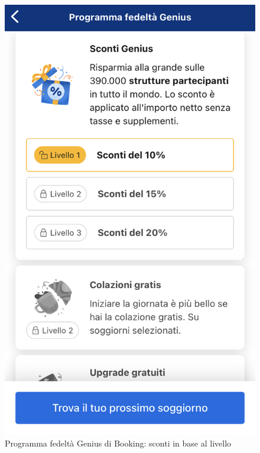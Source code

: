 \begin{figure}
\begin{minipage}[h]{0.4\linewidth}
        \includegraphics[width=1\textwidth]{img/booking-gamification.PNG}
        \caption{Programma fedeltà Genius di Booking: sconti in base al livello \cite{bookingApp}}
        \label{fig:booking-genius}
    \end{minipage}
    \vfill
    \vspace{0.2 cm}
    \centering
    \begin{minipage}[h]{0.4\linewidth}
        \centering

\end{minipage}
\end{figure}
